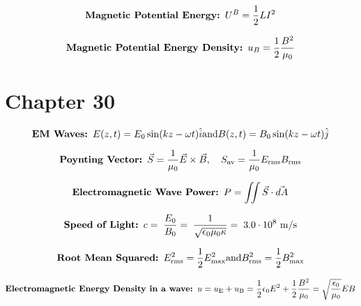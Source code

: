 \documentclass[fleqn,12pt]{article}
\begin{document}
\begin{equation}
    \label{eq2}
   \mbox{\textbf{Magnetic Potential Energy: }} U^B = \frac{1}{2}LI^2
\end{equation}

\begin{equation}
    \label{eq3}
    \mbox{\textbf{Magnetic Potential Energy Density: }}u_B = \frac{1}{2}\frac{B^2}{\mu_0}
\end{equation}

\section*{Chapter 30}

\begin{equation}
    \label{eq3}
    \mbox{\textbf{EM Waves: }}
    {E}(z,t) = {E_0}\sin(kz - \omega t)\hat{i} \\ \mbox{and} \\ {B}(z,t) = {B_0}\sin(kz - \omega t)\hat{j}
\end{equation}


\begin{equation}
    \label{eq3}
    \mbox{\textbf{Poynting Vector: }}
    \vec{S} = \frac{1}{\mu_0}\vec{E} \times \vec{B},\quad S_\mathrm{av} = \frac{1}{\mu_0}E_\mathrm{rms}B_\mathrm{rms}
\end{equation}

\begin{equation}
    \label{eq3}
    \mbox{\textbf{Electromagnetic Wave Power: }}
    P = \iint \vec{S} \cdot \vec{dA}
\end{equation}

\begin{equation}
    \label{eq3}
    \mbox{\textbf{Speed of Light: }}
    c = \; \frac{E_0}{B_0} = \; \frac{1}{\sqrt{\epsilon_0\mu_0\kappa}}  = \; 3.0 \cdot 10^8 \  \si{\meter\per\second}
\end{equation}

\begin{equation}
    \label{eq3}
    \mbox{\textbf{Root Mean Squared: }}
    E_\mathrm{rms}^{2} = \frac{1}{2}E_\mathrm{max}^2 \\ \mbox{and} \\ B_\mathrm{rms}^{2} = \frac{1}{2}B_\mathrm{max}^2
\end{equation}

\begin{equation}
    \label{eq3}
    \mbox{\textbf{Electromagnetic Energy Density in a wave: }}
    u = u_\mathrm{E} + u_\mathrm{B} = \frac{1}{2}\epsilon_0E^2 + \frac{1}{2}\frac{B^2}{\mu_0} = \sqrt{\frac{\epsilon_0}{\mu_0}}E B
\end{equation}
\end{document}

